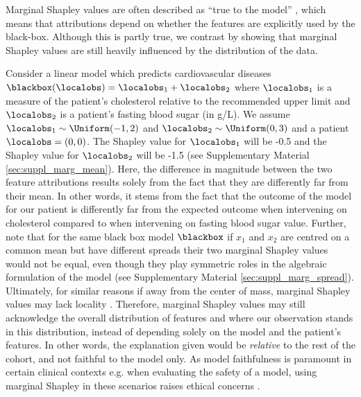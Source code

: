 \documentclass[nohyperref]{article}
\theoremstyle{plain}
\theoremstyle{definition}
\theoremstyle{remark}
\begin{document}
Marginal Shapley values are often described as ``true to the model'' \cite{chen2020true}, which means that attributions depend on whether the features are explicitly used by the black-box. Although this is partly true, we contrast by showing that marginal Shapley values are still heavily influenced by the distribution of the data. 

Consider a linear model which predicts cardiovascular diseases $\blackbox(\localobs)=\localobs_1+\localobs_2$ where $\localobs_1$ is a measure of the patient's cholesterol relative to the recommended upper limit and $\localobs_2$ is a patient's fasting blood sugar (in g/L). We assume $\localobs_1\sim\Uniform(-1, 2)$ and $\localobs_2\sim\Uniform(0, 3)$ and a patient $\localobs=(0, 0)$. The Shapley value for $\localobs_1$ will be -0.5 and the Shapley value for $\localobs_2$ will be -1.5 (see Supplementary Material \ref{sec:suppl_marg_mean}). Here, the difference in magnitude between the two feature attributions results solely from the fact that they are differently far from their mean. In other words, it stems from the fact that the outcome of the model for our patient is differently far from the expected outcome when intervening on cholesterol compared to when intervening on fasting blood sugar value. Further, note that for the same black box model $\blackbox$ if $x_1$ and $x_2$ are centred on a common mean but have different spreads their two marginal Shapley values would not be equal, even though they play symmetric roles in the algebraic formulation of the model (see Supplementary Material \ref{sec:suppl_marg_spread}). Ultimately, for similar reasons if away from the center of mass, marginal Shapley values may lack locality \cite{ghalebikesabi2021locality}.\newline
Therefore, marginal Shapley values may still acknowledge the overall distribution of features and where our observation stands in this distribution, instead of depending solely on the model and the patient's features. In other words, the explanation given would be \emph{relative} to the rest of the cohort, and not faithful to the model only.  As model faithfulness is paramount in certain clinical contexts e.g. when evaluating the safety of a model, using marginal Shapley in these scenarios raises ethical concerns \cite{merrick2020explanation}. 

\end{document}
